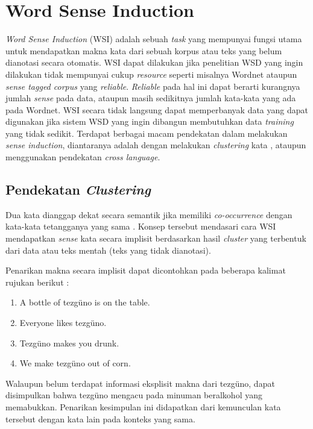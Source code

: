 \section{Word Sense Induction}
\textit{Word Sense Induction} (WSI) adalah sebuah \textit{task} yang mempunyai fungsi utama untuk mendapatkan makna kata dari sebuah korpus atau teks yang belum dianotasi secara otomatis. WSI dapat dilakukan jika penelitian WSD yang ingin dilakukan tidak mempunyai cukup \textit{resource} seperti misalnya Wordnet ataupun \textit{sense tagged corpus} yang \textit{reliable}. \textit{Reliable} pada hal ini dapat berarti kurangnya jumlah \textit{sense} pada data, ataupun masih sedikitnya jumlah kata-kata yang ada pada Wordnet. WSI secara tidak langsung dapat memperbanyak data yang dapat digunakan jika sistem WSD yang ingin dibangun membutuhkan data \textit{training} yang tidak sedikit. Terdapat berbagai macam pendekatan dalam melakukan \textit{sense induction}, diantaranya adalah dengan melakukan \textit{clustering} kata \citep{denkowski2009survey}, ataupun menggunakan pendekatan \textit{cross language}.
	
	\subsection{Pendekatan \textit{Clustering}}
	Dua kata dianggap dekat secara semantik jika memiliki \textit{co-occurrence} dengan kata-kata tetangganya yang sama \citep{nasiruddin2013state}. Konsep tersebut mendasari cara WSI mendapatkan \textit{sense} kata secara implisit berdasarkan hasil \textit{cluster} yang terbentuk dari data atau teks mentah (teks yang tidak dianotasi).
	
	Penarikan makna secara implisit dapat dicontohkan pada beberapa kalimat rujukan berikut \citep{denkowski2009survey}:
	
	\begin{enumerate}
		\item A bottle of tezg\"{u}no is on the table.
		\item Everyone likes tezg\"{u}no.
		\item Tezg\"{u}no makes you drunk.
		\item We make tezg\"{u}no out of corn.
	\end{enumerate}
	
	Walaupun belum terdapat informasi eksplisit makna dari tezg\"{u}no, dapat disimpulkan bahwa tezg\"{u}no mengacu pada minuman beralkohol yang memabukkan. Penarikan kesimpulan ini didapatkan dari kemunculan kata tersebut dengan kata lain pada konteks yang sama.
	
